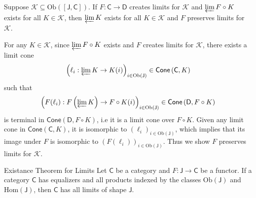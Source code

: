 \begin{proposition}{}{}
    Suppose $\mathcal{K}\subseteq\mathrm{Ob}\left([\mathsf{J}, \mathsf{C}]\right)$. If $F:\mathsf{C}\to \mathsf{D}$ creates limits for $\mathcal{K}$ and $\varprojlim F\circ K$ exists for all $K\in\mathcal{K}$, then $\varprojlim K$ exists for all $K\in\mathcal{K}$ and $F$ preserves limits for $\mathcal{K}$.
\end{proposition}

\begin{prf}
    For any $K\in\mathcal{K}$, since $\varprojlim F\circ K$ exists and $F$ creates limits for $\mathcal{K}$, there exists a limit cone 
    \[
       \left(\ell_i:\varprojlim K\to K(i)\right)_{i\in \mathrm{Ob}(\mathsf{J})}\in\mathsf{Cone}\left(\mathsf{C},K\right)    
    \]
    such that
    \[
        \left(F(\ell_i):F\left(\varprojlim K\right)\to F\circ K(i)\right)_{i\in \mathrm{Ob}(\mathsf{J})}\in \mathsf{Cone}\left(\mathsf{D},F\circ K\right)
    \]
    is terminal in $\mathsf{Cone}\left(\mathsf{D},F\circ K\right)$, i.e it is a limit cone over $F\circ K$. Given any limit cone in $\mathsf{Cone}\left(\mathsf{C},K\right) $, it is isomorphic to $\left(\ell_i\right)_{i\in \mathrm{Ob}(\mathsf{J})}$, which implies that its image under $F$ is isomorphic to $\left(F(\ell_i)\right)_{i\in \mathrm{Ob}(\mathsf{J})}$. Thus we show $F$ preserves limits for $\mathcal{K}$.
\end{prf}


\begin{theorem}{Existance Theorem for Limits}{}
    Let $\mathsf{C}$ be a category and $F:\mathsf{J}\to\mathsf{C}$ be a functor. If a category $\mathsf{C}$ has equalizers and all products indexed by the classes $\mathrm{Ob}(\mathsf{J})$ and $\mathrm{Hom}(\mathsf{J})$, then $\mathsf{C}$ has all limits of shape $\mathsf{J}$.
\end{theorem}


